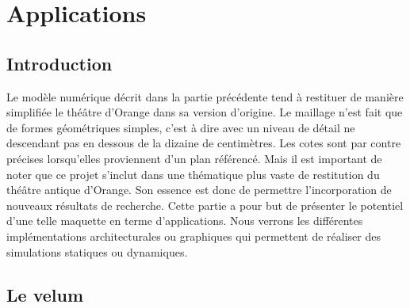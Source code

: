 		
		
		
		
		
		
		
		
		
		
		
\chapter{Applications}
	\minitoc
	\newpage

\section{Introduction}
Le modèle numérique décrit dans la partie précédente tend à restituer de manière simplifiée le théâtre d'Orange dans sa version d'origine. Le maillage n'est fait que de formes géométriques simples, c'est à dire avec un niveau de détail ne descendant pas en dessous de la dizaine de centimètres. Les cotes sont par contre précises lorsqu'elles proviennent d'un plan référencé. Mais il est important de noter que ce projet s'inclut dans une thématique plus vaste de restitution du théâtre antique d'Orange. Son essence est donc de permettre l'incorporation de nouveaux résultats de recherche. Cette partie a pour but de présenter le potentiel d'une telle maquette en terme d'applications. Nous verrons les différentes implémentations architecturales ou graphiques qui permettent de réaliser des simulations statiques ou dynamiques.

\section{Le \gls{velum}} \label{sect_velum}

